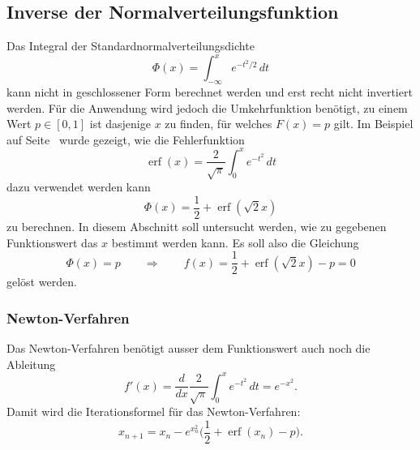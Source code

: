 %
%
%
\subsection{Inverse der Normalverteilungsfunktion
\label{buch:subsection:inversenormal}}
Das Integral der Standardnormalverteilungsdichte
\[
\Phi(x) = \int_{-\infty}^x e^{-t^2/2}\,dt
\]
kann nicht in geschlossener Form berechnet werden und erst recht
nicht invertiert werden.
Für die Anwendung wird jedoch die Umkehrfunktion benötigt, zu einem Wert
$p\in[0,1]$ ist dasjenige $x$ zu finden, für welches $F(x)=p$ gilt.
Im Beispiel auf Seite~\pageref{buch:beispiel:erfc} wurde gezeigt,
wie die Fehlerfunktion
\[
\operatorname{erf}(x) = \frac{2}{\sqrt{\pi}}\int_0^x e^{-t^2}\,dt
\]
dazu verwendet werden kann
\[
\Phi(x) = \frac12+\operatorname{erf}(\sqrt{2}x)
\]
zu berechnen.
In diesem Abschnitt soll untersucht werden, wie zu gegebenen Funktionswert
das $x$ bestimmt werden kann.
Es soll also die Gleichung
\[
\Phi(x)=p
\qquad\Rightarrow\qquad
f(x)=\frac12+\operatorname{erf}(\sqrt{2}x)-p=0
\]
gelöst werden.

\subsubsection{Newton-Verfahren}
Das Newton-Verfahren benötigt ausser dem Funktionswert auch noch die 
Ableitung
\[
f'(x)
=
\frac{d}{dx}\frac{2}{\sqrt{\pi}}\int_0^x e^{-t^2}\,dt
=
e^{-x^2}.
\]
Damit wird die Iterationsformel für das Newton-Verfahren:
\begin{equation}
x_{n+1} = x_n - e^{x_n^2} \biggl(\frac12+\operatorname{erf}(x_n) -p \biggr).
\end{equation}





